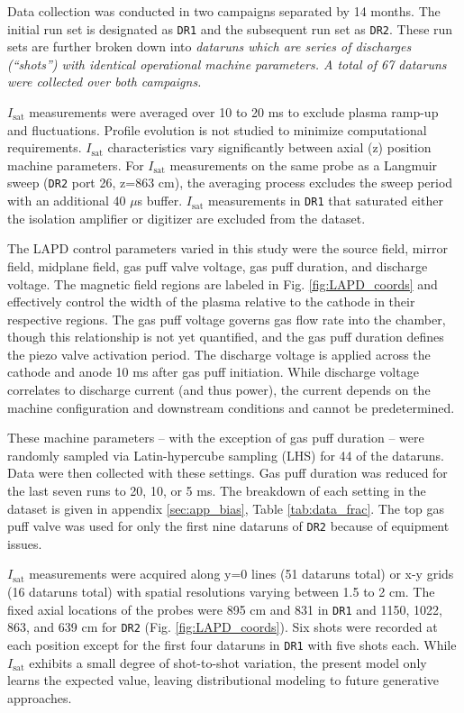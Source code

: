 Data collection was conducted in two campaigns separated by 14 months. The initial run set is designated as \texttt{DR1} and the subsequent run set as \texttt{DR2}. These run sets are further broken down into \em dataruns \em which are series of discharges (``shots'') with identical operational machine parameters. A total of 67 dataruns were collected over both campaigns. 

$I_\text{sat}$ measurements were averaged over 10 to 20 ms to exclude plasma ramp-up and fluctuations. Profile evolution is not studied to minimize computational requirements. $I_\text{sat}$ characteristics vary significantly between axial (z) position machine parameters. For $I_\text{sat}$ measurements on the same probe as a Langmuir sweep (\texttt{DR2} port 26, z=863 cm), the averaging process excludes the sweep period with an additional 40 $\mu$s buffer. $I_\text{sat}$ measurements in \texttt{DR1} that saturated either the isolation amplifier or digitizer are excluded from the dataset.

The LAPD control parameters varied in this study were the source field, mirror field, midplane field, gas puff valve voltage, gas puff duration, and discharge voltage. The magnetic field regions are labeled in Fig. \ref{fig:LAPD_coords} and effectively control the width of the plasma relative to the cathode in their respective regions. The gas puff voltage governs gas flow rate into the chamber, though this relationship is not yet quantified, and the gas puff duration defines the piezo valve activation period. The discharge voltage is applied across the cathode and anode 10 ms after gas puff initiation. While discharge voltage correlates to discharge current (and thus power), the current depends on the machine configuration and downstream conditions and cannot be predetermined.

These machine parameters -- with the exception of gas puff duration -- were randomly sampled via Latin-hypercube sampling (LHS) for 44 of the dataruns. Data were then collected with these settings. Gas puff duration was reduced for the last seven runs to 20, 10, or 5 ms. The breakdown of each setting in the dataset is given in appendix \ref{sec:app_bias}, Table \ref{tab:data_frac}. The top gas puff valve was used for only the first nine dataruns of \texttt{DR2} because of equipment issues. 

$I_\text{sat}$ measurements were acquired along y=0 lines (51 dataruns total) or x-y grids (16 dataruns total) with spatial resolutions varying between 1.5 to 2 cm. The fixed axial locations of the probes were 895 cm and 831 in \texttt{DR1} and 1150, 1022, 863, and 639 cm for \texttt{DR2} (Fig. \ref{fig:LAPD_coords}). Six shots were recorded at each position except for the first four dataruns in \texttt{DR1} with five shots each. While $I_\text{sat}$ exhibits a small degree of shot-to-shot variation, the present model only learns the expected value, leaving distributional modeling to future generative approaches.

